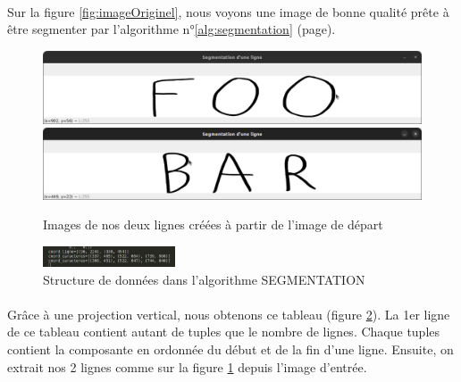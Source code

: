 \documentclass[a4paper]{article}
\begin{document}
			\paragraph{} Sur la figure \ref{fig:imageOriginel}, nous voyons une image de bonne qualité prête à être segmenter par l'algorithme n°\ref{alg:segmentation} (page\pageref{alg:segmentation}). 
			
			
			\begin{figure}
				\centering
				\includegraphics[width=.8\textwidth]{segmentation_ligne1.png}
				\includegraphics[width=.8\textwidth]{segmentation_ligne2.png}
				\caption{Images de nos deux lignes créées à partir de l'image de départ}
				\label{fig:imageLignes}
			\end{figure}
			
			
			\begin{figure}
				\includegraphics[width=0.35\textwidth]{structDonnee.png}
				\caption{Structure de données dans l'algorithme SEGMENTATION}
				\label{fig:structDonnee}
			
			\end{figure}

			\paragraph{} Grâce à une projection vertical, nous obtenons ce tableau (figure \ref{fig:structDonnee}). La 1er ligne de ce tableau contient autant de tuples que le nombre de lignes. Chaque tuples contient la composante en ordonnée du début et de la fin d'une ligne. Ensuite, on extrait nos 2 lignes comme sur la figure \ref{fig:imageLignes} depuis l'image d'entrée.
\end{document}

